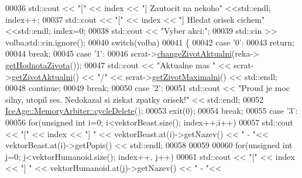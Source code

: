 \begin{DoxyCode}
00036             std::cout << \textcolor{stringliteral}{"["} << index << \textcolor{stringliteral}{"] Zautocit na nekoho"} <<std::endl; index++;
00037             std::cout << \textcolor{stringliteral}{"["} << index << \textcolor{stringliteral}{"] Hledat orisek cichem"} <<std::endl; index=0;
00038             std::cout << \textcolor{stringliteral}{"Vyber akci:"};
00039             std::cin >> volba;std::cin.ignore();
00040             \textcolor{keywordflow}{switch}(volba)
00041             \{
00042                 \textcolor{keywordflow}{case} \textcolor{charliteral}{'0'}:
00043                     \textcolor{keywordflow}{return};
00044                     \textcolor{keywordflow}{break};
00045                 \textcolor{keywordflow}{case} \textcolor{charliteral}{'1'}:
00046                     scrat->\hyperlink{classIceAge_1_1Zivot_a980dc5a5af6d14c23ecca025e3ec7485}{changeZivotAktualni}(reka->
      \hyperlink{classIceAge_1_1Reka_acc4d9a4ef69da03eed8762e16a33b49f}{getHodnotaZivota}());
00047                     std::cout << \textcolor{stringliteral}{"Aktualne mas "} << scrat->\hyperlink{classIceAge_1_1Zivot_ae4e3a167722a80ccace3985f183ddd8d}{getZivotAktualni}() << \textcolor{stringliteral}{"/"} << 
      scrat->\hyperlink{classIceAge_1_1Zivot_a75a65879dd6ddc0bc3e402ac6f613813}{getZivotMaximalni}() << std::endl;
00048                     \textcolor{keywordflow}{continue};
00049                     \textcolor{keywordflow}{break};
00050                 \textcolor{keywordflow}{case} \textcolor{charliteral}{'2'}:
00051                     std::cout << \textcolor{stringliteral}{"Proud je moc silny, utopil ses. Nedokazal si ziskat zpatky orisek!"} << 
      std::endl;
00052                     \hyperlink{classIceAge_1_1MemoryArbiter_ae3460492678cf992629f4a70de3ef1ca}{IceAge::MemoryArbiter::cycleDelete}();
00053                     exit(0);
00054                     \textcolor{keywordflow}{break};
00055                 \textcolor{keywordflow}{case} \textcolor{charliteral}{'3'}:
00056                     \textcolor{keywordflow}{for}(\textcolor{keywordtype}{unsigned} \textcolor{keywordtype}{int} i=0; i<vektorBeast.size(); index++,i++)
00057                         std::cout << \textcolor{stringliteral}{"["} << index << \textcolor{stringliteral}{"] "} << vektorBeast.at(i)->getNazev() << \textcolor{stringliteral}{" - "}<< 
      vektorBeast.at(i)->getPopis() << std::endl;
00058 
00059 
00060                     \textcolor{keywordflow}{for}(\textcolor{keywordtype}{unsigned} \textcolor{keywordtype}{int} j=0; j<vektorHumanoid.size(); index++, j++)
00061                         std::cout << \textcolor{stringliteral}{"["} << index << \textcolor{stringliteral}{"] "} << vektorHumanoid.at(j)->getNazev() << \textcolor{stringliteral}{" - "}<< 

\end{DoxyCode}
